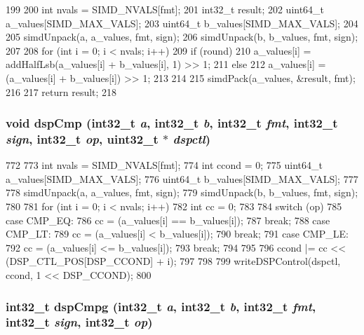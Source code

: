 \begin{DoxyCode}
199 {
200     int nvals = SIMD_NVALS[fmt];
201     int32_t result;
202     uint64_t a_values[SIMD_MAX_VALS];
203     uint64_t b_values[SIMD_MAX_VALS];
204 
205     simdUnpack(a, a_values, fmt, sign);
206     simdUnpack(b, b_values, fmt, sign);
207 
208     for (int i = 0; i < nvals; i++) {
209         if (round)
210             a_values[i] = addHalfLsb(a_values[i] + b_values[i], 1) >> 1;
211         else
212             a_values[i] = (a_values[i] + b_values[i]) >> 1;
213     }
214 
215     simdPack(a_values, &result, fmt);
216 
217     return result;
218 }
\end{DoxyCode}
\hypertarget{namespaceMipsISA_abbbcf8d18bd1b22f7507e7485fbdac5a}{
\subsubsection[{dspCmp}]{\setlength{\rightskip}{0pt plus 5cm}void dspCmp (int32\_\-t {\em a}, \/  int32\_\-t {\em b}, \/  int32\_\-t {\em fmt}, \/  int32\_\-t {\em sign}, \/  int32\_\-t {\em op}, \/  {\bf uint32\_\-t} $\ast$ {\em dspctl})}}
\label{namespaceMipsISA_abbbcf8d18bd1b22f7507e7485fbdac5a}



\begin{DoxyCode}
772 {
773     int nvals = SIMD_NVALS[fmt];
774     int ccond = 0;
775     uint64_t a_values[SIMD_MAX_VALS];
776     uint64_t b_values[SIMD_MAX_VALS];
777 
778     simdUnpack(a, a_values, fmt, sign);
779     simdUnpack(b, b_values, fmt, sign);
780 
781     for (int i = 0; i < nvals; i++) {
782         int cc = 0;
783 
784         switch (op) {
785           case CMP_EQ:
786             cc = (a_values[i] == b_values[i]);
787             break;
788           case CMP_LT:
789             cc = (a_values[i] < b_values[i]);
790             break;
791           case CMP_LE:
792             cc = (a_values[i] <= b_values[i]);
793             break;
794         }
795 
796         ccond |= cc << (DSP_CTL_POS[DSP_CCOND] + i);
797     }
798 
799     writeDSPControl(dspctl, ccond, 1 << DSP_CCOND);
800 }
\end{DoxyCode}
\hypertarget{namespaceMipsISA_a295d7a6bdde8c31aff5fa704fd0b076b}{
\subsubsection[{dspCmpg}]{\setlength{\rightskip}{0pt plus 5cm}int32\_\-t dspCmpg (int32\_\-t {\em a}, \/  int32\_\-t {\em b}, \/  int32\_\-t {\em fmt}, \/  int32\_\-t {\em sign}, \/  int32\_\-t {\em op})}}
\label{namespaceMipsISA_a295d7a6bdde8c31aff5fa704fd0b076b}



